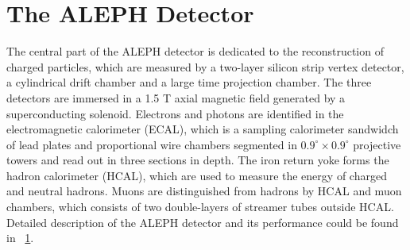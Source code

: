 \section{The ALEPH Detector}

The central part of the ALEPH detector is dedicated to the reconstruction of charged particles, which are measured by a two-layer silicon strip vertex detector, a cylindrical drift chamber and a large time projection chamber. The three detectors are immersed in a 1.5 T axial magnetic field generated by a superconducting solenoid. Electrons and photons are identified in the electromagnetic calorimeter (ECAL), which is a sampling calorimeter sandwidch of lead plates and proportional wire chambers segmented in $0.9^\circ\times 0.9^\circ$ projective towers and read out in three sections in depth. The iron return yoke forms the hadron calorimeter (HCAL), which are used to measure the energy of charged and neutral hadrons. Muons are distinguished from hadrons by HCAL and muon chambers, which consists of two double-layers of streamer tubes outside HCAL. Detailed description of the ALEPH detector and its performance could be found in ~\ref{}.
